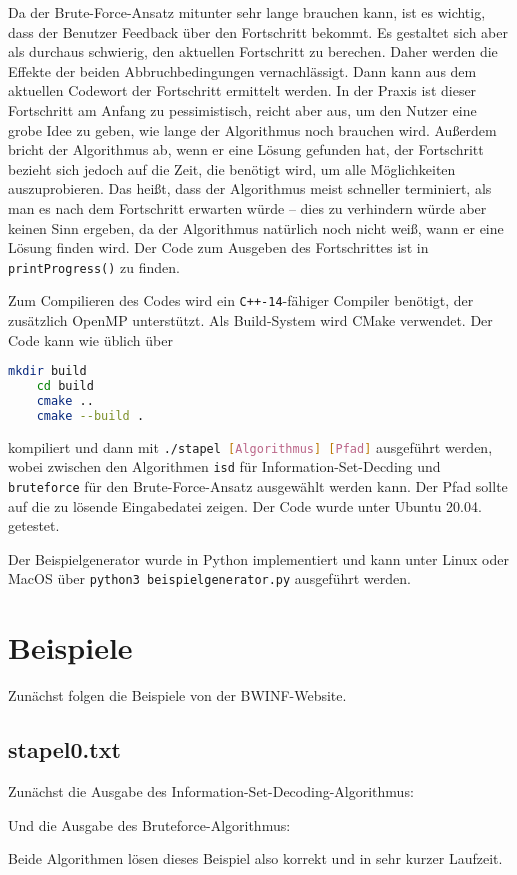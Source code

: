 \documentclass[a4paper,10pt,ngerman]{scrartcl}
\begin{document}
Da der Brute-Force-Ansatz mitunter sehr lange brauchen kann, ist es wichtig, dass der Benutzer Feedback über den Fortschritt bekommt. 
Es gestaltet sich aber als durchaus schwierig, den aktuellen Fortschritt zu berechen. 
Daher werden die Effekte der beiden Abbruchbedingungen vernachlässigt. 
Dann kann aus dem aktuellen Codewort der Fortschritt ermittelt werden.
In der Praxis ist dieser Fortschritt am Anfang zu pessimistisch, reicht aber aus, um den Nutzer eine grobe Idee zu geben, wie lange der Algorithmus noch brauchen wird. 
Außerdem bricht der Algorithmus ab, wenn er eine Lösung gefunden hat, der Fortschritt bezieht sich jedoch auf die Zeit, die benötigt wird, um alle Möglichkeiten auszuprobieren. 
Das heißt, dass der Algorithmus meist schneller terminiert, als man es nach dem Fortschritt erwarten würde -- dies zu verhindern würde aber keinen Sinn ergeben, da der Algorithmus natürlich noch nicht weiß, wann er eine Lösung finden wird. 
Der Code zum Ausgeben des Fortschrittes ist in \lstinline{printProgress()} zu finden.

Zum Compilieren des Codes wird ein \lstinline{C++-14}-fähiger Compiler benötigt, der zusätzlich OpenMP unterstützt.
Als Build-System wird CMake verwendet. 
Der Code kann wie üblich über 
\begin{lstlisting}[language=bash]
    mkdir build
    cd build
    cmake ..
    cmake --build . 
\end{lstlisting}    
kompiliert und dann mit \lstinline[language=bash]{./stapel [Algorithmus] [Pfad]} ausgeführt werden, wobei zwischen den Algorithmen \lstinline{isd} für Information-Set-Decding und \lstinline{bruteforce} für den Brute-Force-Ansatz ausgewählt werden kann. Der Pfad sollte auf die zu lösende Eingabedatei zeigen. Der Code wurde unter Ubuntu 20.04. getestet.

Der Beispielgenerator wurde in Python implementiert und kann unter Linux oder MacOS über \lstinline[language=bash]{python3 beispielgenerator.py} ausgeführt werden.
\section{Beispiele}
Zunächst folgen die Beispiele von der BWINF-Website.
\subsection*{stapel0.txt}
Zunächst die Ausgabe des Information-Set-Decoding-Algorithmus: 

Und die Ausgabe des Bruteforce-Algorithmus:

Beide Algorithmen lösen dieses Beispiel also korrekt und in sehr kurzer Laufzeit.
\end{document}
